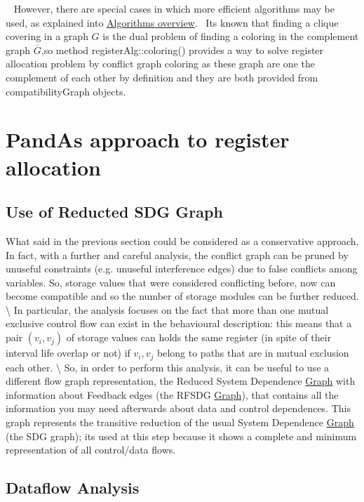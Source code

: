 ~\newline
 However, there are special cases in which more efficient algorithms may be used, as explained into \hyperlink{src_HLS_registerAllocation_page_algorithms}{Algorithms overview}.~\newline
 It\textquotesingle{}s known that finding a clique covering in a graph $G$ is the dual problem of finding a coloring in the complement graph $\overline{G}$,so method register\+Alg\+::coloring() provides a way to solve register allocation problem by conflict graph coloring as these graph are one the complement of each other by definition and they are both provided from compatibility\+Graph objects.\hypertarget{src_HLS_registerAllocation_page_pandaApproach}{}\section{Pand\+A\textquotesingle{}s approach to register allocation}\label{src_HLS_registerAllocation_page_pandaApproach}
\hypertarget{src_HLS_registerAllocation_page_use_RFSDG}{}\subsection{Use of Reducted S\+D\+G Graph}\label{src_HLS_registerAllocation_page_use_RFSDG}
What said in the previous section could be considered as a conservative approach. In fact, with a further and careful analysis, the conflict graph can be pruned by unuseful constraints (e.\+g. unuseful interference edges) due to false conflicts among variables. So, storage values that were considered conflicting before, now can become compatible and so the number of storage modules can be further reduced. \textbackslash{} In particular, the analysis focuses on the fact that more than one mutual exclusive control flow can exist in the behavioural description\+: this means that a pair $ (v_i,v_j) $ of storage values can holds the same register (in spite of their interval life overlap or not) if $ v_i,v_j $ belong to paths that are in mutual exclusion each other. \textbackslash{} So, in order to perform this analysis, it can be useful to use a different flow graph representation, the Reduced System Dependence \hyperlink{structGraph}{Graph} with information about Feedback edges (the R\+F\+S\+DG \hyperlink{structGraph}{Graph}), that contains all the information you may need afterwards about data and control dependences. This graph represents the transitive reduction of the usual System Dependence \hyperlink{structGraph}{Graph} (the S\+DG graph); it\textquotesingle{}s used at this step because it shows a complete and minimum representation of all control/data flows.\hypertarget{src_HLS_registerAllocation_page_data}{}\subsection{Dataflow Analysis}\label{src_HLS_registerAllocation_page_data}
